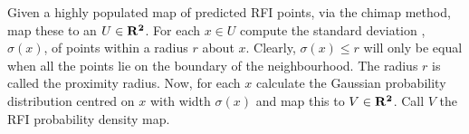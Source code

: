 \documentclass[a4paper,12pt]{article}
\begin{document}
                                                                                                                                                                                                                                                                                                                                                                                                                                                                                                                                                                                                                                                                                                                                                                                                                                                                                                                                                                                                                                                                                                                                                                                                                                                                                                                                                                                                                                                                                                                                                                                                                                                                                                                                                                                                                                                                                                                                              Given a highly populated map of predicted RFI points, via the chimap method, map these to an $U \in \bf{R}^2$. For each $x \in U$ compute the standard deviation , $\sigma(x)$, of points within a radius $r$ about $x$. Clearly, $\sigma(x) \le r$ will only be equal when all the points lie on the boundary of the neighbourhood. The radius $r$ is called the proximity radius. Now, for each $x$ calculate the Gaussian probability distribution centred on $x$ with width $\sigma(x)$ and map this to $V \in \bf{R}^2$. Call $V$ the RFI probability density map. 
\end{document}
